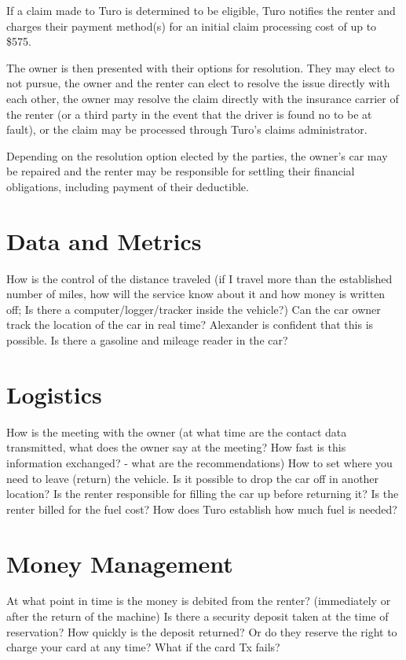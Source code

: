 \documentclass[review,12pt]{elsarticle}
\begin{document}
If a claim made to Turo is determined to be eligible, Turo notifies the renter and charges their payment method(s) for an initial claim processing cost of up to \$575.

The owner is then presented with their options for resolution. They may elect to not pursue, the owner and the renter can elect to resolve the issue directly with each other, the owner may resolve the claim directly with the insurance carrier of the renter (or a third party in the event that the driver is found no to be at fault), or the claim may be processed through Turo's claims administrator.

Depending on the resolution option elected by the parties, the owner's car may be repaired and the renter may be responsible for settling their financial obligations, including payment of their deductible.

\section{Data and Metrics}
How is the control of the distance traveled (if I travel more than the established number of miles, how will the service know about it and how money is written off; Is there a computer/logger/tracker inside the vehicle?)
Can the car owner track the location of the car in real time? Alexander is confident that this is possible.
Is there a gasoline and mileage reader in the car?

\section{Logistics}
How is the meeting with the owner (at what time are the contact data transmitted, what does the owner say at the meeting? How fast is this information exchanged? - what are the recommendations)
How to set where you need to leave (return) the vehicle. Is it possible to drop the car off in another location?
Is the renter responsible for filling the car up before returning it? Is the renter billed for the fuel cost? How does Turo establish how much fuel is needed?

\section{Money Management}
At what point in time is the money is debited from the renter? (immediately or after the return of the machine)
Is there a security deposit taken at the time of reservation? How quickly is the deposit returned? Or do they reserve the right to charge your card at any time? What if the card Tx fails?
\end{document}
